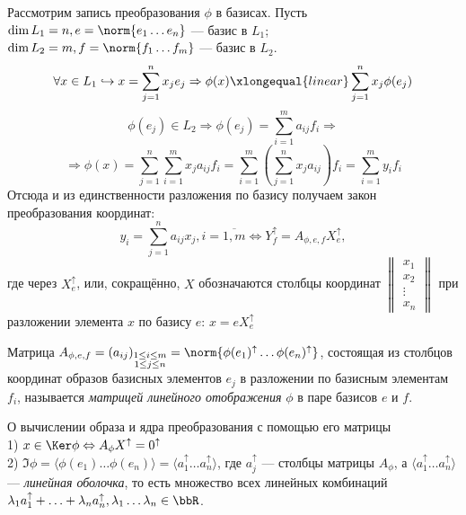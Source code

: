   Рассмотрим запись преобразования $\phi$  в базисах. Пусть $\dim L_1 = n, e=\norm{e_1 \ldots e_n}$ --- базис в $L_1$; $\dim L_2 = m, f=\norm{f_1 \ldots f_m}$ --- базис в $L_2$.
  \begin{equation*}
  \forall x \in L_1 \hookrightarrow x=\sum_{j=1}^n x_je_j \Rightarrow \phi(x)\xlongequal{linear}\sum_{j=1}^n x_j\phi(e_j) 
  \end{equation*}
  \begin{equation*}
  \phi(e_j) \in L_2 \Rightarrow \phi(e_j)=\sum_{i=1}^m a_{ij}f_i \Rightarrow 
  \end{equation*}
  \begin{equation*}
  \Rightarrow \phi(x)=\sum_{j=1}^n\sum_{i=1}^m x_ja_{ij}f_i = \sum_{i=1}^m(\sum_{j=1}^n x_ja_{ij})f_i = \sum_{i=1}^m y_if_i
  \end{equation*}
  Отсюда и из единственности разложения по базису получаем закон преобразования координат:
  \begin{equation}
  y_i=\sum_{j=1}^n a_{ij}x_j, i=\overline{1,m} \Leftrightarrow Y_f^\uparrow=A_{\phi,e,f}X_e^\uparrow,
  \end{equation}
  где через $X_e^\uparrow$, или, сокращённо, $X$ обозначаются столбцы координат $\begin{Vmatrix}
  x_1 \\ x_2 \\ \vdots \\ x_n
  \end{Vmatrix}$ при разложении элемента $x$ по базису $e$: $x=e X_e^\uparrow$
  \begin{defn}
  Матрица $A_{\phi,e,f}=(a_{ij})_{\substack{ 1\le i\le m \\ 1\le j\le n }}=\norm{\phi(e_1)^\uparrow \ldots \phi(e_n)^\uparrow}$, состоящая из столбцов координат образов базисных элементов $e_j$ в разложении по базисным элементам $f_i$, называется \textit{матрицей линейного отображения} $\phi$ в паре базисов $e$ и $f$.
  \end{defn}
  \begin{stt}\label{22.1.KerIm} {О вычислении образа и ядра преобразования с помощью его матрицы} $ $\\
  1) $x \in \Ker\phi \Leftrightarrow A_\phi X^\uparrow=0^\uparrow$ \\
  2) $\Im\phi=\langle\phi(e_1) \ldots \phi(e_n)\rangle=\langle a_1^\uparrow \ldots a_n^\uparrow\rangle$, где $a_j^\uparrow$ --- столбцы матрицы $A_\phi$, а $\langle a_1^\uparrow \ldots a_n^\uparrow\rangle$ --- \textit{линейная оболочка}, то есть множество всех линейных комбинаций $\lambda_1 a_1^\uparrow + \ldots + \lambda_n a_n^\uparrow, \lambda_1\ldots\lambda_n \in \bbR$.
  \end{stt}
